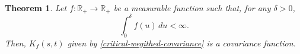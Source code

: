 \documentclass[preprint,12pt,authoryear]{elsarticle}
\def\R{\mathbb{R}}
\newtheorem{thm}{Theorem}
\begin{document}
\begin{thm} \label{Main-th1}
    Let $f:\mathbb{R}_{+}\to \mathbb{R}_{+}$ be a measurable function such that, for any $\delta>0$,
    \begin{equation}\label{Integrability-condition}
        \int_0^\delta f(u)\, du<\infty .
    \end{equation}
    Then, $K_f(s,t)$ given by \eqref{critical-wegithed-covariance} is a covariance function.
\end{thm}



\end{document}
